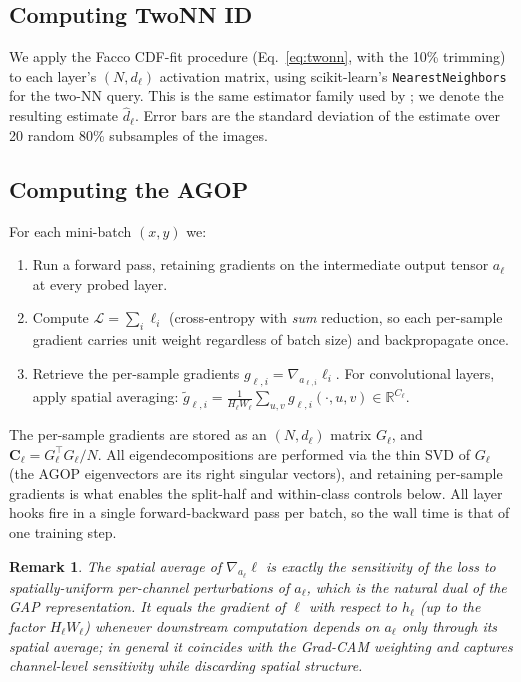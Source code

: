 \documentclass{article}
\newtheorem{remark}{Remark}
\newcommand{\R}{\mathbb{R}}
\newcommand{\AGOP}{\mathbf{C}}          %
\newcommand{\id}{\hat{d}}               %
\begin{document}
\subsection{Computing TwoNN ID}

We apply the Facco CDF-fit procedure (Eq.~\eqref{eq:twonn}, with the 10\%
trimming) to each layer's $(N,d_\ell)$ activation matrix, using
scikit-learn's \texttt{NearestNeighbors} for the two-NN query.  This is the
same estimator family used by \citet{ansuini2019intrinsic}; we denote the
resulting estimate $\id_\ell$.  Error bars are the standard deviation of the
estimate over 20 random 80\% subsamples of the images.

\subsection{Computing the AGOP}
\label{sec:agop_comp}

For each mini-batch $(x,y)$ we:
\begin{enumerate}
  \item Run a forward pass, retaining gradients on the intermediate output
    tensor $a_\ell$ at every probed layer.
  \item Compute $\mathcal{L} = \sum_i \ell_i$ (cross-entropy with
    \emph{sum} reduction, so each per-sample gradient carries unit weight
    regardless of batch size) and backpropagate once.
  \item Retrieve the per-sample gradients $g_{\ell,i} =
    \nabla_{a_{\ell,i}}\ell_i$.  For convolutional layers, apply spatial
    averaging: $\tilde{g}_{\ell,i} =
    \frac{1}{H_\ell W_\ell}\sum_{u,v}g_{\ell,i}(\cdot,u,v)\in\R^{C_\ell}$.
\end{enumerate}
The per-sample gradients are stored as an $(N, d_\ell)$ matrix $G_\ell$, and
$\AGOP_\ell = G_\ell^\top G_\ell / N$.  All eigendecompositions are performed
via the thin SVD of $G_\ell$ (the AGOP eigenvectors are its right singular
vectors), and retaining per-sample gradients is what enables the split-half
and within-class controls below.  All layer hooks fire in a single
forward-backward pass per batch, so the wall time is that of one training
step.

\begin{remark}
The spatial average of $\nabla_{a_\ell}\ell$ is exactly the sensitivity of
the loss to spatially-uniform per-channel perturbations of $a_\ell$, which is
the natural dual of the GAP representation.  It equals the gradient of
$\ell$ with respect to $h_\ell$ (up to the factor $H_\ell W_\ell$) whenever
downstream computation depends on $a_\ell$ only through its spatial average;
in general it coincides with the Grad-CAM weighting
\citep{selvaraju2017gradcam} and captures channel-level sensitivity while
discarding spatial structure.
\end{remark}
\end{document}
